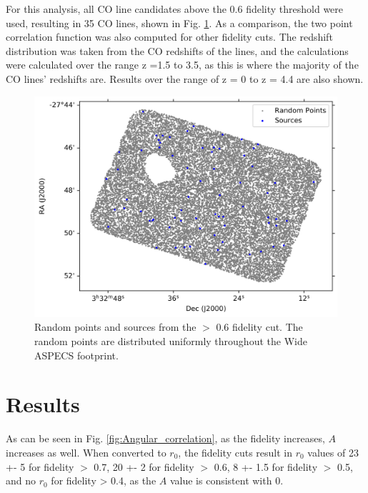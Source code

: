 For this analysis, all CO line candidates above the 0.6 fidelity threshold were used, resulting in 35 CO lines, shown in Fig. \ref{fig:Clustering_points}. As a comparison, the two point correlation function was also computed for other fidelity cuts. The redshift distribution was taken from the CO redshifts of the lines, and the calculations were calculated over the range z =1.5 to 3.5, as this is where the majority of the CO lines' redshifts are. Results over the range of z = 0 to z = 4.4 are also shown. 

\begin{figure}[tbp]
\centering \includegraphics[width=120mm]{PDFS/NX_V_Y_Sources_20000.png}
\caption{Random points and sources from the $>$ 0.6 fidelity cut. The random points are distributed uniformly throughout the Wide ASPECS footprint.}
\label{fig:Clustering_points}
\end{figure}

\section{Results}

As can be seen in Fig. \ref{fig:Angular_correlation}, as the fidelity increases, $A$ increases as well. When converted to $r_0$, the fidelity cuts result in $r_0$ values of 23 +- 5 for fidelity $>$ 0.7, 20 +- 2 for fidelity $>$ 0.6, 8 +- 1.5 for fidelity $>$ 0.5, and no $r_0$ for fidelity > 0.4, as the $A$ value is consistent with 0.

